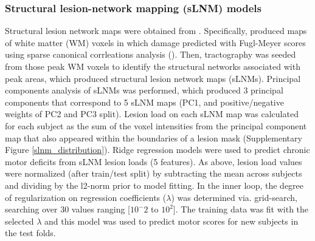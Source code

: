 \documentclass[phd,tocprelim]{cornell}
\begin{document}
\subsubsection*{Structural lesion-network mapping (sLNM) models}
Structural lesion network maps were obtained from \cite{Bowren2022-rs}. Specifically, \cite{Bowren2022-rs} produced maps of white matter (WM) voxels in which damage predicted with Fugl-Meyer scores using sparse canonical corrleations analysis (\cite{Pustina2018-xv}). Then, tractography was seeded from those peak WM voxels to identify the structural networks associated with peak areas, which produced structural lesion network maps (sLNMs). Principal components analysis of sLNMs was performed, which produced 3 principal components that correspond to 5 sLNM maps (PC1, and positive/negative weights of PC2 and PC3 split). Lesion load on each sLNM map was calculated for each subject as the sum of the voxel intensities from the principal component map that also appeared within the boundaries of a lesion mask (Supplementary Figure \ref{slnm_distribution}). Ridge regression models were used to predict chronic motor deficits from sLNM lesion loads (5 features). As above, lesion load values were normalized (after train/test split) by subtracting the mean across subjects and dividing by the l2-norm prior to model fitting. In the inner loop, the degree of regularization on regression coefficients ($\lambda$) was determined via. grid-search, searching over 30 values ranging [$10^-2$ to $10^2$]. The training data was fit with the selected $\lambda$ and this model was used to predict motor scores for new subjects in the test folds. 
\end{document}
